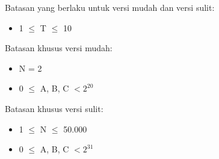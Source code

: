 \documentclass[../main_problemset.tex]{subfiles} %
\begin{document}
\begin{minipage}[t]{0.47\textwidth}
	
Batasan yang berlaku untuk versi mudah dan versi sulit:

\begin{itemize}
	\item 1 $ \leq $ T $ \leq $ 10
\end{itemize}
\end{minipage}
\begin{minipage}[t]{0.06\textwidth}
	\hfill
\end{minipage}
\begin{minipage}[t]{0.47\textwidth}
Batasan khusus versi mudah:
\begin{itemize}
	\item N = 2
	\item 0 $ \le $ A, B, C $ < 2^{20} $
\end{itemize}

\vspace{.2cm}

Batasan khusus versi sulit:
\begin{itemize}
	\item 1 $ \le $ N $ \le $ 50.000
	\item 0 $ \le $ A, B, C $ < 2^{31} $
\end{itemize}
\end{minipage}
\end{document}
